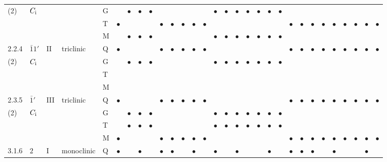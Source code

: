 \documentclass[fleqn,9pt,landscape]{jsarticle}
\begin{document}
\begin{longtable}{lllll|l|lll|ll|lll|l|lll|lll|l|ll|lll|lll}
(2) & $C_{\rm i}$ &  &  & G &  & $\bullet$ & $\bullet$ & $\bullet$ &  &  &  &  &  & $\bullet$ & $\bullet$ & $\bullet$ & $\bullet$ & $\bullet$ & $\bullet$ & $\bullet$ &  &  &  &  &  &  &  &  &  \\
 &  &  &  & T & $\bullet$ &  &  &  & $\bullet$ & $\bullet$ & $\bullet$ & $\bullet$ & $\bullet$ &  &  &  &  &  &  &  & $\bullet$ & $\bullet$ & $\bullet$ & $\bullet$ & $\bullet$ & $\bullet$ & $\bullet$ & $\bullet$ & $\bullet$ \\
 &  &  &  & M &  & $\bullet$ & $\bullet$ & $\bullet$ &  &  &  &  &  & $\bullet$ & $\bullet$ & $\bullet$ & $\bullet$ & $\bullet$ & $\bullet$ & $\bullet$ &  &  &  &  &  &  &  &  &  \\ \hline
2.2.4 & \texttt{$\bar{1}1'$} & II & triclinic & Q & $\bullet$ &  &  &  & $\bullet$ & $\bullet$ & $\bullet$ & $\bullet$ & $\bullet$ &  &  &  &  &  &  &  & $\bullet$ & $\bullet$ & $\bullet$ & $\bullet$ & $\bullet$ & $\bullet$ & $\bullet$ & $\bullet$ & $\bullet$ \\
(2) & $C_{\rm i}$ &  &  & G &  & $\bullet$ & $\bullet$ & $\bullet$ &  &  &  &  &  & $\bullet$ & $\bullet$ & $\bullet$ & $\bullet$ & $\bullet$ & $\bullet$ & $\bullet$ &  &  &  &  &  &  &  &  &  \\
 &  &  &  & T &  &  &  &  &  &  &  &  &  &  &  &  &  &  &  &  &  &  &  &  &  &  &  &  &  \\
 &  &  &  & M &  &  &  &  &  &  &  &  &  &  &  &  &  &  &  &  &  &  &  &  &  &  &  &  &  \\ \hline
2.3.5 & \texttt{$\bar{1}'$} & III & triclinic & Q & $\bullet$ &  &  &  & $\bullet$ & $\bullet$ & $\bullet$ & $\bullet$ & $\bullet$ &  &  &  &  &  &  &  & $\bullet$ & $\bullet$ & $\bullet$ & $\bullet$ & $\bullet$ & $\bullet$ & $\bullet$ & $\bullet$ & $\bullet$ \\
(2) & $C_{\rm i}$ &  &  & G &  & $\bullet$ & $\bullet$ & $\bullet$ &  &  &  &  &  & $\bullet$ & $\bullet$ & $\bullet$ & $\bullet$ & $\bullet$ & $\bullet$ & $\bullet$ &  &  &  &  &  &  &  &  &  \\
 &  &  &  & T &  & $\bullet$ & $\bullet$ & $\bullet$ &  &  &  &  &  & $\bullet$ & $\bullet$ & $\bullet$ & $\bullet$ & $\bullet$ & $\bullet$ & $\bullet$ &  &  &  &  &  &  &  &  &  \\
 &  &  &  & M & $\bullet$ &  &  &  & $\bullet$ & $\bullet$ & $\bullet$ & $\bullet$ & $\bullet$ &  &  &  &  &  &  &  & $\bullet$ & $\bullet$ & $\bullet$ & $\bullet$ & $\bullet$ & $\bullet$ & $\bullet$ & $\bullet$ & $\bullet$ \\ \hline
3.1.6 & \texttt{$2$} & I & monoclinic & Q & $\bullet$ &  & $\bullet$ &  & $\bullet$ & $\bullet$ &  & $\bullet$ &  & $\bullet$ &  & $\bullet$ &  &  & $\bullet$ &  & $\bullet$ & $\bullet$ & $\bullet$ &  & $\bullet$ &  &  & $\bullet$ &  \\

\end{longtable}
\end{document}
